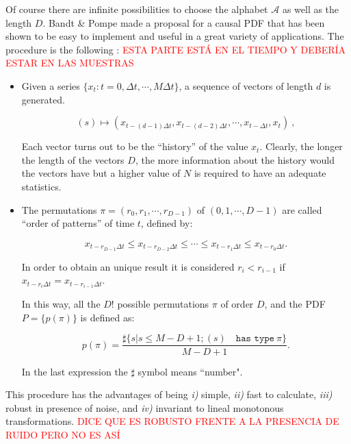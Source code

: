 Of course there are infinite possibilities to choose the alphabet $\mathcal{A}$ as well as the length $D$.
Bandt \& Pompe made a proposal for a causal PDF that has been shown to be easy to implement and useful in a great variety of applications.
The procedure is the following \cite{Pompe2002,Keller2003,Keller2005}: \textcolor{red}{ESTA PARTE ESTÁ EN EL TIEMPO Y DEBERÍA ESTAR EN LAS MUESTRAS}
\begin{itemize}
\item Given a series $\{x_t : t=0, \Delta t, \cdots,M\Delta t \}$, a sequence of vectors of length $d$ is generated.

\begin{equation}
\label{eq:vectores}
(s)\mapsto \left(x_{t-(d-1)\Delta t},x_{t-(d-2)\Delta t},\cdots,x_{t-\Delta t},x_{t}\right) \ ,
\end{equation}

Each vector turns out to be the ``history'' of the value $x_t$. Clearly, the longer the length of the vectors $D$, the more information about the history would the vectors have but a higher value of $N$ is required to have an adequate statistics. 

\item The permutations $\pi=(r_0, r_1, \cdots, r_{D-1})$ of $(0, 1, \cdots, D-1)$ are called ``order of patterns'' of time $t$, defined by:

\begin{equation}
\label{eq:permuta}
x_{t-r_{D-1}\Delta t}\le x_{t-r_{D-2}\Delta t}\le\cdots\le x_{t-r_{1}\Delta t}\le x_{t-r_0\Delta t}.
\end{equation}

In order to obtain an unique result it is considered $r_i<r_{i-1}$ if $x_{t-r_{i}\Delta t}=x_{t-r_{i-1}\Delta t}$.

In this way, all the $D!$ possible permutations $\pi$ of order $D$, and the PDF $P=\{p(\pi)\}$ is defined as:

\begin{equation}
\label{eq:frequ}
p(\pi)=\frac{\sharp \{s|s\leq M-D+1; (s) \quad \texttt{has type}~\pi\}}{M-D+1}.
\end{equation}

In the last expression the $\sharp$ symbol means ``number".
\end{itemize}

This procedure has the advantages of being {\it i)} simple, {\it ii)} fast to calculate, {\it iii)} robust in presence of noise, and {\it iv)} invariant to lineal monotonous transformations. \textcolor{red}{DICE QUE ES ROBUSTO FRENTE A LA PRESENCIA DE RUIDO PERO NO ES ASÍ}

